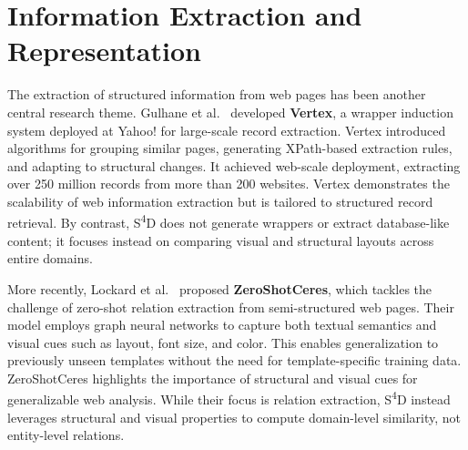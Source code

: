

\section{Information Extraction and Representation}
\label{sec:information-extraction}

The extraction of structured information from web pages has been another central research theme. Gulhane et al.~\cite{gulhane2011vertex} developed \textbf{Vertex}, a wrapper induction system deployed at Yahoo! for large-scale record extraction. Vertex introduced algorithms for grouping similar pages, generating XPath-based extraction rules, and adapting to structural changes. It achieved web-scale deployment, extracting over 250 million records from more than 200 websites. Vertex demonstrates the scalability of web information extraction but is tailored to structured record retrieval. By contrast, S\textsuperscript{4}D does not generate wrappers or extract database-like content; it focuses instead on comparing visual and structural layouts across entire domains.

More recently, Lockard et al.~\cite{lockard2020zeroshotceres} proposed \textbf{ZeroShotCeres}, which tackles the challenge of zero-shot relation extraction from semi-structured web pages. Their model employs graph neural networks to capture both textual semantics and visual cues such as layout, font size, and color. This enables generalization to previously unseen templates without the need for template-specific training data. ZeroShotCeres highlights the importance of structural and visual cues for generalizable web analysis. While their focus is relation extraction, S\textsuperscript{4}D instead leverages structural and visual properties to compute domain-level similarity, not entity-level relations.

